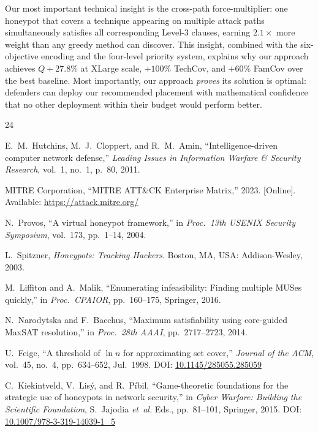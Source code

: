 \documentclass[journal]{IEEEtran}
\newcommand{\etal}{\emph{et~al.}}
\begin{document}
Our most important technical insight is the cross-path
force-multiplier: one honeypot that covers a technique
appearing on multiple attack paths simultaneously satisfies
all corresponding Level-3 clauses, earning $2.1\times$ more
weight than any greedy method can discover.
This insight, combined with the six-objective encoding and
the four-level priority system, explains why our approach
achieves $Q{+}27.8\%$ at XLarge scale, $+100\%$ TechCov,
and $+60\%$ FamCov over the best baseline.
Most importantly, our approach \emph{proves} its solution is
optimal: defenders can deploy our recommended placement with
mathematical confidence that no other deployment within
their budget would perform better.

\begin{thebibliography}{24}

E.~M.~Hutchins, M.~J.~Cloppert, and R.~M.~Amin,
``Intelligence-driven computer network defense,''
\textit{Leading Issues in Information Warfare \& Security
Research}, vol.~1, no.~1, p.~80, 2011.

MITRE Corporation, ``MITRE ATT\&CK Enterprise Matrix,''
2023. [Online]. Available: \url{https://attack.mitre.org/}

N.~Provos, ``A virtual honeypot framework,''
in \textit{Proc.\ 13th USENIX Security Symposium},
vol.~173, pp.~1--14, 2004.

L.~Spitzner, \textit{Honeypots: Tracking Hackers}.
Boston, MA, USA: Addison-Wesley, 2003.

M.~Liffiton and A.~Malik,
``Enumerating infeasibility: Finding multiple MUSes
quickly,'' in \textit{Proc.\ CPAIOR},
pp.~160--175, Springer, 2016.

N.~Narodytska and F.~Bacchus,
``Maximum satisfiability using core-guided MaxSAT
resolution,'' in \textit{Proc.\ 28th AAAI},
pp.~2717--2723, 2014.

U.~Feige,
``A threshold of $\ln n$ for approximating set cover,''
\textit{Journal of the ACM}, vol.~45, no.~4,
pp.~634--652, Jul.~1998.
DOI: \href{https://doi.org/10.1145/285055.285059}
{10.1145/285055.285059}


C.~Kiekintveld, V.~Lis\'{y}, and R.~P\'{i}bil,
``Game-theoretic foundations for the strategic use of
honeypots in network security,''
in \textit{Cyber Warfare: Building the Scientific
Foundation}, S.~Jajodia \etal{} Eds.,
pp.~81--101, Springer, 2015.
DOI: \href{https://doi.org/10.1007/978-3-319-14039-1_5}
{10.1007/978-3-319-14039-1\_5}


\end{thebibliography}
\end{document}

